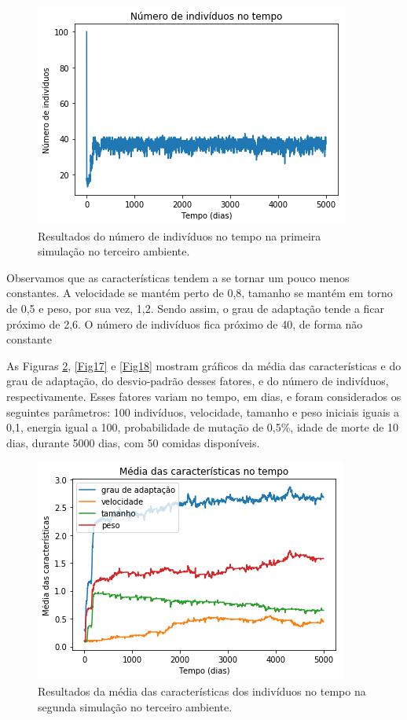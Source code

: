 \documentclass[10pt,brazil,english]{article}
\begin{document}
        \begin{figure}[!hbtp]
            \begin{center}
                \includegraphics[scale=0.5]{Images/3-3.png}
            \end{center}
            \caption{Resultados do número de indivíduos no tempo na primeira simulação no terceiro ambiente.}
            \label{Fig15}
        \end{figure}
        
        Observamos que as características tendem a se tornar um pouco menos constantes. A velocidade se mantém perto de 0,8, tamanho se mantém em torno de 0,5 e peso, por sua vez, 1,2. Sendo assim, o grau de adaptação tende a ficar próximo de 2,6. O número de indivíduos fica próximo de 40, de forma não constante
        
        As Figuras \ref{Fig16}, \ref{Fig17} e \ref{Fig18} mostram gráficos da média das características e do grau de adaptação, do desvio-padrão desses fatores, e do número de indivíduos, respectivamente. Esses fatores variam no tempo, em dias, e foram considerados os seguintes parâmetros: 100 indivíduos, velocidade, tamanho e peso iniciais iguais a 0,1, energia igual a 100, probabilidade de mutação de 0,5\%, idade de morte de 10 dias, durante  5000 dias, com 50 comidas disponíveis.
        
        \begin{figure}[!hbtp]
            \begin{center}
                \includegraphics[scale=0.5]{Images/3-4.png}
            \end{center}
            \caption{Resultados da média das características dos indivíduos no tempo na segunda simulação no terceiro ambiente.}
            \label{Fig16}
        \end{figure} 
        
\end{document}
